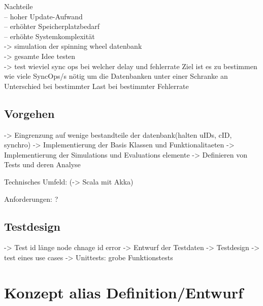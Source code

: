 \documentclass[a4paper,11pt,oneside,%
headsepline,												%
footsepline,												%
bibtotocnumbered									%
]{scrreprt}
\begin{document}
Nachteile\\
– hoher Update-Aufwand\\
– erhöhter Speicherplatzbedarf\\
– erhöhte Systemkomplexität\\

-> simulation der spinning wheel datenbank\\
-> gesamte Idee testen\\
-> test wieviel sync ops bei welcher delay und fehlerrate
Ziel ist es zu bestimmen wie viele SyncOps/s nötig um die Datenbanken unter einer Schranke an Unterschied bei bestimmter Last bei bestimmter Fehlerrate

\section{Vorgehen}
-> Eingrenzung auf wenige bestandteile der datenbank(halten uIDs, cID, synchro)
-> Implementierung der Basis Klassen und Funktionalitaeten 
-> Implementierung der Simulations und Evaluations elemente
-> Definieren von Tests und deren Analyse

Technisches Umfeld:
(-> Scala mit Akka)

Anforderungen:
?

\section{Testdesign}
-> Test id länge node chnage id error
-> Entwurf der Testdaten
-> Testdesign -> test eines use cases
-> Unittests: grobe Funktionstests 


\chapter{Konzept alias Definition/Entwurf}
\end{document}
